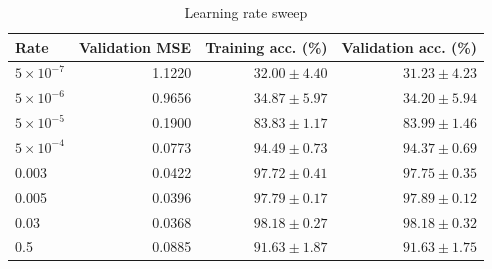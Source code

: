 \begin{table}[htbp]
\centering
\caption{Learning rate sweep}
\label{tab:rates}
\small
\begin{tabular}{lrrr}
\toprule
Rate & Validation MSE & Training acc. (\%) & Validation acc. (\%) \\
\midrule
$5\times10^{-7}$ & 1.1220 & $32.00\pm 4.40$ & $31.23\pm 4.23$ \\
$5\times10^{-6}$ & 0.9656 & $34.87\pm 5.97$ & $34.20\pm 5.94$ \\
$5\times10^{-5}$ & 0.1900 & $83.83\pm 1.17$ & $83.99\pm 1.46$ \\
$5\times10^{-4}$ & 0.0773 & $94.49\pm 0.73$ & $94.37\pm 0.69$ \\
0.003 & 0.0422 & $97.72\pm 0.41$ & $97.75\pm 0.35$ \\
0.005 & 0.0396 & $97.79\pm 0.17$ & $97.89\pm 0.12$ \\
0.03 & 0.0368 & $98.18\pm 0.27$ & $98.18\pm 0.32$ \\
0.5 & 0.0885 & $91.63\pm 1.87$ & $91.63\pm 1.75$ \\
\bottomrule
\end{tabular}
\end{table}

